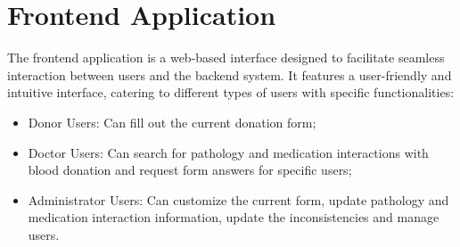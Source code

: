 %
%
%
%
%
%





\section{Frontend Application}\label{architecture_frontend}

The frontend application is a web-based interface designed to facilitate seamless interaction between users and the backend system. It features a user-friendly and intuitive interface, catering to different types of users with specific functionalities:

\begin{itemize}
	\item Donor Users: Can fill out the current donation form;
	\item Doctor Users: Can search for pathology and medication interactions with blood donation and request form answers for specific users;
	\item Administrator Users: Can customize the current form, update pathology and medication interaction information, update the inconsistencies and manage users.
\end{itemize}

